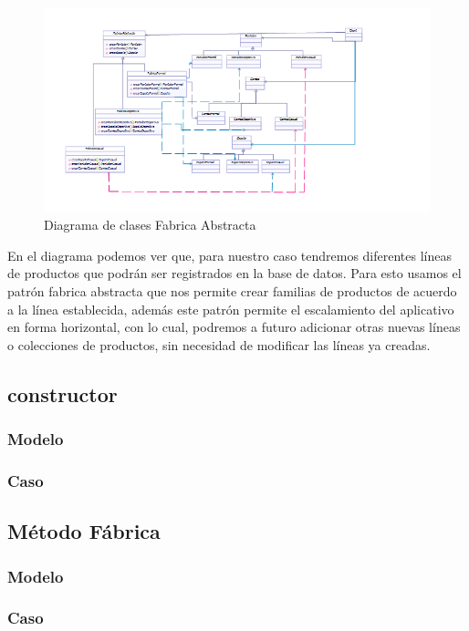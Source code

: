 	\begin{figure}[th!]
		\centering
		\includegraphics[width=1\linewidth]{arquitectura/imagenes/DiagramaFabricaAbstracta}
		\caption{Diagrama de clases Fabrica Abstracta}
	\end{figure}
	
	
	
	En el diagrama podemos ver que, para nuestro caso tendremos diferentes líneas de productos que podrán ser registrados en la base de datos. Para esto usamos el patrón fabrica abstracta que nos permite crear familias de productos de acuerdo a la línea establecida, además este patrón permite el escalamiento del aplicativo en forma horizontal, con lo cual, podremos a futuro adicionar otras nuevas líneas o colecciones de productos, sin necesidad de modificar las líneas ya creadas.
	
	
\newpage


\subsection{constructor}
\subsubsection{Modelo}
\newpage
\subsubsection{Caso}
\newpage

\subsection{Método Fábrica}
\subsubsection{Modelo}
\newpage
\subsubsection{Caso}
\newpage

